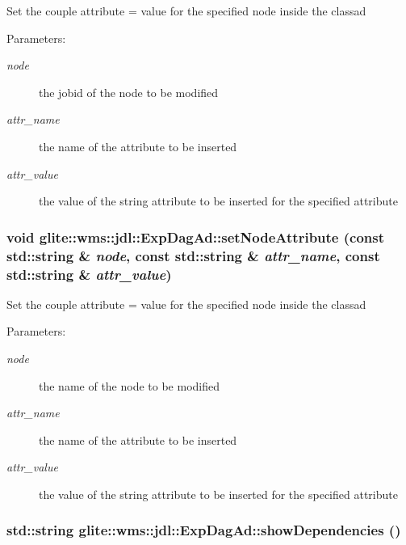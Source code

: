 Set the couple attribute = value for the specified node inside the classad \begin{Desc}
\item[Parameters:]
\begin{description}
\item[{\em node}]the jobid of the node to be modified \item[{\em attr\_\-name}]the name of the attribute to be inserted \item[{\em attr\_\-value}]the value of the string attribute to be inserted for the specified attribute \end{description}
\end{Desc}
\hypertarget{classglite_1_1wms_1_1jdl_1_1ExpDagAd_a9}{
\subsubsection[setNodeAttribute]{\setlength{\rightskip}{0pt plus 5cm}void glite::wms::jdl::Exp\-Dag\-Ad::set\-Node\-Attribute (const std::string \& {\em node}, const std::string \& {\em attr\_\-name}, const std::string \& {\em attr\_\-value})}}
\label{classglite_1_1wms_1_1jdl_1_1ExpDagAd_a9}


Set the couple attribute = value for the specified node inside the classad \begin{Desc}
\item[Parameters:]
\begin{description}
\item[{\em node}]the name of the node to be modified \item[{\em attr\_\-name}]the name of the attribute to be inserted \item[{\em attr\_\-value}]the value of the string attribute to be inserted for the specified attribute \end{description}
\end{Desc}
\hypertarget{classglite_1_1wms_1_1jdl_1_1ExpDagAd_a21}{
\subsubsection[showDependencies]{\setlength{\rightskip}{0pt plus 5cm}std::string glite::wms::jdl::Exp\-Dag\-Ad::show\-Dependencies ()}}
\label{classglite_1_1wms_1_1jdl_1_1ExpDagAd_a21}


